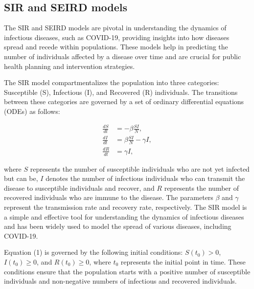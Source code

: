 \documentclass[12pt]{article}
\begin{document}
\subsection{SIR and SEIRD models}
The SIR and SEIRD models are pivotal in understanding the dynamics of infectious diseases, such as COVID-19, providing insights into how diseases spread and recede within populations. These models help in predicting the number of individuals affected by a disease over time and are crucial for public health planning and intervention strategies.

The SIR model compartmentalizes the population into three categories: Susceptible (S), Infectious (I), and Recovered (R) individuals. The transitions between these categories are governed by a set of ordinary differential equations (ODEs) as follows:

\begin{equation}
    \begin{align}
        \frac{dS}{dt} &= -\beta \frac{SI}{N}, \\
        \frac{dI}{dt} &= \beta \frac{SI}{N} - \gamma I, \\
        \frac{dR}{dt} &= \gamma I,
    \end{align}
\end{equation}

where $S$ represents the number of susceptible individuals who are not yet infected but can be, $I$ denotes the number of infectious individuals who can transmit the disease to susceptible individuals and recover, and $R$ represents the number of recovered individuals who are immune to the disease. The parameters $\beta$ and $\gamma$ represent the transmission rate and recovery rate, respectively. The SIR model is a simple and effective tool for understanding the dynamics of infectious diseases and has been widely used to model the spread of various diseases, including COVID-19.

Equation (1) is governed by the following initial conditions: $S(t_0) > 0$, $I(t_0) \geq 0$, and $R(t_0) \geq 0$, where $t_0$ represents the initial point in time. These conditions ensure that the population starts with a positive number of susceptible individuals and non-negative numbers of infectious and recovered individuals. 
\end{document}
